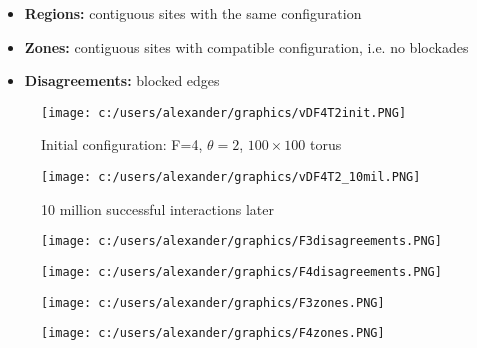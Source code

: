 \documentclass[
paper=128mm:96mm, %
fontsize=11pt, %
pagesize, %
parskip=half-, %
]{scrartcl} %
\theoremstyle{mythmstyle} %
\begin{document}
\begin{itemize}
\item \textbf{Regions:} contiguous sites with the same configuration
\item \textbf{Zones:} contiguous sites with compatible configuration, i.e. no blockades
\item \textbf{Disagreements:} blocked edges 
\end{itemize}

\clearpage

\begin{figure}[!tbp]
  \centering
  \begin{minipage}[b]{0.4\textwidth}
    \texttt{[image: c:/users/alexander/graphics/vDF4T2init.PNG]}
    \caption{Initial configuration: F=4, $\theta=2$, $100\times 100$ torus}
  \end{minipage}
  \hfill
  \begin{minipage}[b]{0.4\textwidth}
    \texttt{[image: c:/users/alexander/graphics/vDF4T2\_10mil.PNG]}
    \caption{10 million successful interactions later}
  \end{minipage}
\end{figure}

\clearpage

\begin{figure}[!tbp]
  \centering
  \begin{minipage}[b]{0.50\textwidth}
    \texttt{[image: c:/users/alexander/graphics/F3disagreements.PNG]}
  \end{minipage}
  \begin{minipage}[b]{0.50\textwidth}
    \texttt{[image: c:/users/alexander/graphics/F4disagreements.PNG]}
  \end{minipage}
\end{figure}

\clearpage

\begin{figure}[!tbp]
  \centering
  \begin{minipage}[b]{0.50\textwidth}
    \texttt{[image: c:/users/alexander/graphics/F3zones.PNG]}
  \end{minipage}
  \begin{minipage}[b]{0.50\textwidth}
    \texttt{[image: c:/users/alexander/graphics/F4zones.PNG]}
  \end{minipage}
\end{figure}

\clearpage
\end{document}
